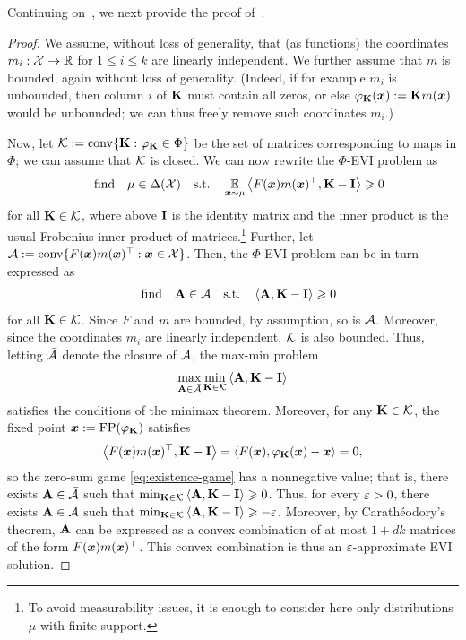 Continuing on~, we next provide the proof of~.

\finitedim*

\begin{proof}
We assume, without loss of generality, that (as functions) the coordinates $m_i : {\mathcal{X}} \to \mathbb R$ for $1 \le i \le k$ are linearly independent. We further assume that $m$ is bounded, again without loss of generality. (Indeed, if for example $m_i$ is unbounded, then column $i$ of ${\mathbf{K}}$ must contain all zeros, or else $\varphi_{\mathbf{K}}({\bm{x}}) := {\mathbf{K}} m({\bm{x}})$ would be unbounded; we can thus freely remove such coordinates $m_i$.)

Now, let ${\mathcal{K}} := \operatorname{conv}\{ {\mathbf{K}} : \varphi_{\mathbf{K}} \in \Phi\}$ be the set of matrices corresponding to maps in $\Phi$; we can assume that ${\mathcal{K}}$ is closed. We can now rewrite the $\Phi$-EVI problem as
    \begin{align*}
        \qq{find} \mu\in \Delta(\cX) \qq{s.t.} \E_{\vx\sim\mu}\ip{F(\vx) m(\vx)^\top, \mK - \mI} \ge 0
    \end{align*}
    for all ${\mathbf{K}} \in {\mathcal{K}}$, where above $\mathbf{I}$ is the identity matrix and the inner product is the usual Frobenius inner product of matrices.\footnote{To avoid measurability issues, it is enough to consider here only distributions $\mu$ with finite support.} Further, let ${\mathcal{A}} := \operatorname{conv} \{ F({\bm{x}}) m({\bm{x}})^\top : {\bm{x}} \in {\mathcal{X}}\}$. Then, the $\Phi$-EVI problem can be in turn expressed as
    \begin{align*}
        \qq{find} \mA \in \cA \qq{s.t.} \ip{\mA, \mK - \mI} \ge 0
    \end{align*}
    for all ${\mathbf{K}} \in {\mathcal{K}}$. Since $F$ and $m$ are bounded, by assumption, so is ${\mathcal{A}}$. Moreover, since the coordinates $m_i$ are linearly independent, ${\mathcal{K}}$ is also bounded. Thus, letting $\bar{{\mathcal{A}}}$ denote the closure of ${\mathcal{A}}$, the max-min problem
    \begin{align}\label{eq:existence-game}
        \max_{\mA \in \bar\cA} \min_{\mK \in \cK} \ip{\mA, \mK - \mI}
    \end{align}
    satisfies the conditions of the minimax theorem. Moreover, for any ${\mathbf{K}}\in{\mathcal{K}}$, the fixed point ${\bm{x}} := \operatorname{FP}(\varphi_{\mathbf{K}})$ satisfies 
    \begin{align*}
        \ip{F(\vx) m(\vx)^\top, \mK - \mI} = \ip{F(\vx), \phi_\mK(\vx) - \vx} = 0,
    \end{align*}
    so the zero-sum game \eqref{eq:existence-game} has a nonnegative value; that is, there exists ${\mathbf{A}} \in \bar{{\mathcal{A}}}$ such that $\min_{\mK \in \cK} \ip{\mA, \mK - \mI} \ge 0$. Thus, for every $\varepsilon > 0$, there exists ${\mathbf{A}} \in {\mathcal{A}}$ such that $\min_{\mK \in \cK} \ip{\mA, \mK - \mI} \ge -\eps$. Moreover, by Carath\'eodory's theorem, ${\mathbf{A}}$ can be expressed as a convex combination of at most $1+dk$ matrices of the form $F({\bm{x}}) m({\bm{x}})^\top$. This convex combination is thus an $\varepsilon$-approximate EVI solution.
\end{proof}

